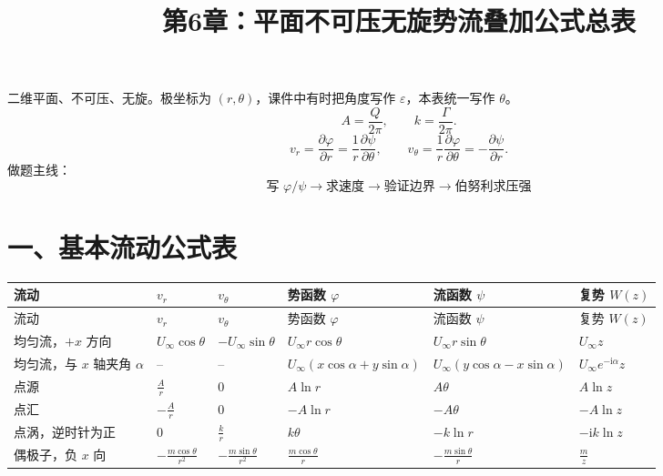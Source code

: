 \documentclass[10.5pt,a4paper]{ctexart}
\title{\vspace{-1.2em}第6章：平面不可压无旋势流叠加公式总表}
\author{}
\date{}
\newcommand{\ds}{\displaystyle}
\newcommand{\ii}{\mathrm{i}}
\begin{document}
\maketitle
\vspace{-2.2em}

\begin{tcolorbox}[colback=blue!3,colframe=blue!45!black,title=统一约定]
二维平面、不可压、无旋。极坐标为 $(r,\theta)$，课件中有时把角度写作 $\varepsilon$，本表统一写作 $\theta$。
\[
A=\frac{Q}{2\pi},\qquad k=\frac{\Gamma}{2\pi}.
\]
\[
v_r=\frac{\partial\varphi}{\partial r}
=\frac{1}{r}\frac{\partial\psi}{\partial\theta},
\qquad
v_\theta=\frac{1}{r}\frac{\partial\varphi}{\partial\theta}
=-\frac{\partial\psi}{\partial r}.
\]
做题主线：
\[
\boxed{\text{写 } \varphi/\psi \rightarrow \text{求速度} \rightarrow \text{验证边界} \rightarrow \text{伯努利求压强}}
\]
\end{tcolorbox}

\section*{一、基本流动公式表}

\small
\begin{longtable}{>{\raggedright\arraybackslash}p{2.0cm}
>{\centering\arraybackslash}p{2.35cm}
>{\centering\arraybackslash}p{2.35cm}
>{\centering\arraybackslash}p{3.25cm}
>{\centering\arraybackslash}p{3.25cm}
>{\centering\arraybackslash}p{2.5cm}}
\toprule
流动 & $v_r$ & $v_\theta$ & 势函数 $\varphi$ & 流函数 $\psi$ & 复势 $W(z)$\\
\midrule
\endfirsthead
\toprule
流动 & $v_r$ & $v_\theta$ & 势函数 $\varphi$ & 流函数 $\psi$ & 复势 $W(z)$\\
\midrule
\endhead

均匀流，$+x$ 方向
& $U_\infty\cos\theta$
& $-U_\infty\sin\theta$
& $U_\infty r\cos\theta$
& $U_\infty r\sin\theta$
& $U_\infty z$\\

均匀流，与 $x$ 轴夹角 $\alpha$
& -- & --
& $U_\infty(x\cos\alpha+y\sin\alpha)$
& $U_\infty(y\cos\alpha-x\sin\alpha)$
& $U_\infty e^{-\ii\alpha}z$\\

点源
& $\ds \frac{A}{r}$
& $0$
& $A\ln r$
& $A\theta$
& $A\ln z$\\

点汇
& $\ds -\frac{A}{r}$
& $0$
& $-A\ln r$
& $-A\theta$
& $-A\ln z$\\

点涡，逆时针为正
& $0$
& $\ds \frac{k}{r}$
& $k\theta$
& $-k\ln r$
& $-\ii k\ln z$\\

偶极子，负 $x$ 向
& $\ds -\frac{m\cos\theta}{r^2}$
& $\ds -\frac{m\sin\theta}{r^2}$
& $\ds \frac{m\cos\theta}{r}$
& $\ds -\frac{m\sin\theta}{r}$
& $\ds \frac{m}{z}$\\
\bottomrule
\end{longtable}
\normalsize
\end{document}
